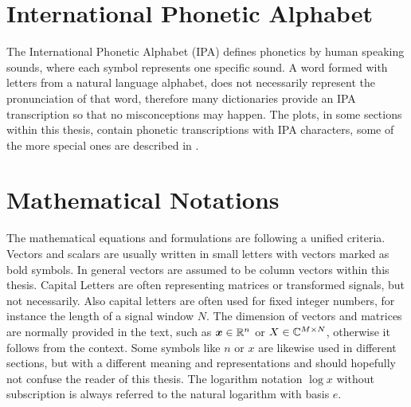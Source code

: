 
\section{International Phonetic Alphabet}\label{sec:appendix_ipa}
The International Phonetic Alphabet (IPA) defines phonetics by human speaking sounds, where each symbol represents one specific sound.
A word formed with letters from a natural language alphabet, does not necessarily represent the pronunciation of that word, therefore many dictionaries provide an IPA transcription so that no misconceptions may happen.
The plots, in some sections within this thesis, contain phonetic transcriptions with IPA characters, some of the more special ones are described in .




\section{Mathematical Notations}\label{sec:appendix_math}
The mathematical equations and formulations are following a unified criteria.
Vectors and scalars are usually written in small letters with vectors marked as bold symbols.
In general vectors are assumed to be column vectors within this thesis.
Capital Letters are often representing matrices or transformed signals, but not necessarily.
Also capital letters are often used for fixed integer numbers, for instance the length of a signal window $N$.
The dimension of vectors and matrices are normally provided in the text, such as $\bm{x} \in \mathbb{R}^n$ or $X \in \mathbb{C}^{M \times N}$, otherwise it follows from the context.
Some symbols like $n$ or $x$ are likewise used in different sections, but with a different meaning and representations and should hopefully not confuse the reader of this thesis.
The logarithm notation $\log x$ without subscription is always referred to the natural logarithm with basis $e$.